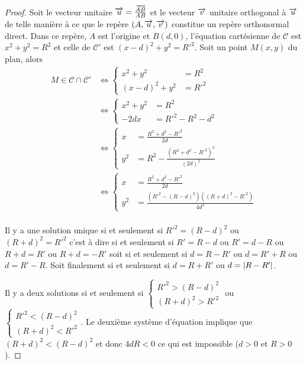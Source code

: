 \begin{proof}
  Soit le vecteur unitaire \(\overrightarrow{u} = \frac{\overrightarrow{AB}}{AB}\) et le vecteur 
  \(\overrightarrow{v}\) unitaire orthogonal à \(\overrightarrow{u}\) de telle manière à ce que le repère 
  \((A , \overrightarrow{u} , \overrightarrow{v})\) constitue un repère orthonormal direct. Dans ce 
  repère, \(A\) est l'origine et \(B(d , 0)\), l'équation cartésienne de 
  \(\mathcal{C}\) est \(x^2 + y^2 = R^2\) et celle de \(\mathcal{C}'\) est 
  \((x - d)^2 + y^2 = R'^2\). Soit un point \(M(x , y)\) du plan, alors
  \begin{align}
    M \in \mathcal{C} \cap \mathcal{C}' 
      &\iff 
      \begin{cases}
        x^2 + y^2 &= R^2 \\ (x - d)^2 + y^2 &= R'^2
      \end{cases}\\
      &\iff 
      \begin{cases}
        x^2 + y^2 &= R^2 \\ -2dx &= R'^2 - R^2 - d^2
      \end{cases}\\
      &\iff 
      \begin{cases} 
        x &= \frac{R^2 + d^2 - R'^2}{2d} \\
        y^2 &= R^2 - \frac{(R^2 + d^2 - R'^2)^2}{(2d)^2}
      \end{cases}\\
      &\iff 
      \begin{cases}
        x &= \frac{R^2 + d^2 - R'^2}{2d} \\ 
        y^2 &= \frac{(R'^2 - (R - d)^2)((R + d)^2 - R'^2)}{4d^2}
      \end{cases}\\
  \end{align}

  Il y a une solution unique si et seulement si \(R'^2 = (R - d)^2\) ou 
  \((R + d)^2 = R'^2\) c'est à dire si et seulement si \(R' = R - d\) ou 
  \(R' = d - R\) ou \(R + d = R'\) ou \(R + d = -R'\) soit si et seulement 
  si \(d = R - R'\) ou \(d = R' + R\) ou \(d = R'-R\). Soit finalement si 
  et seulement si \(d = R + R'\) ou \(d = \left\lvert R - R'\right\rvert\).

  Il y a deux solutions si et seulement si \(
  \begin{cases}
    R'^2 > (R - d)^2 \\ 
    (R + d)^2>R'^2
  \end{cases}
  \) ou \(
  \begin{cases}
    R'^2 < (R - d)^2 \\
    (R + d)^2<R'^2
  \end{cases}
  \).
  Le deuxième système d'équation implique que \((R + d)^2<(R - d)^2\) et 
  donc \(4dR<0\) ce qui est impossible (\(d>0\) et \(R>0\)).


\end{proof}
